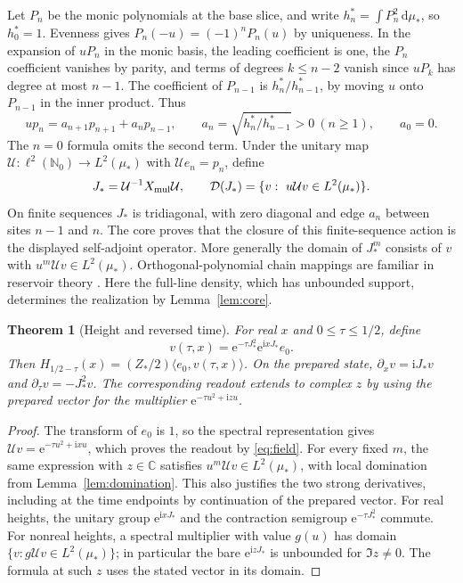 \documentclass[11pt]{article}
\numberwithin{equation}{section}
\newtheorem{theorem}{Theorem}[section]
\newcommand{\C}{\mathbb C}
\newcommand{\ee}{\mathrm e}
\newcommand{\ii}{\mathrm i}
\newcommand{\dd}{\,\mathrm d}
\newcommand{\ip}[2]{\langle #1,#2\rangle}
\begin{document}
Let \(P_n\) be the monic polynomials at the base slice, and write
\(h_n^*=\int P_n^2\dd\mu_*\), so \(h_0^*=1\).
Evenness gives \(P_n(-u)=(-1)^nP_n(u)\) by uniqueness.
In the expansion of \(uP_n\) in the monic basis, the leading
coefficient is one, the \(P_n\) coefficient vanishes by parity, and
terms of degrees \(k\le n-2\) vanish since \(uP_k\) has degree at most
\(n-1\). The coefficient of \(P_{n-1}\) is \(h_n^*/h_{n-1}^*\),
by moving \(u\) onto \(P_{n-1}\) in the inner product. Thus
\[
 up_n=a_{n+1}p_{n+1}+a_np_{n-1},\qquad
 a_n=\sqrt{h_n^*/h_{n-1}^*}>0\ (n\ge1),\qquad a_0=0.
\]
The \(n=0\) formula omits the second term. Under the unitary map
\(\mathcal U:\ell^2(\mathbb N_0)\to L^2(\mu_*)\) with
\(\mathcal U e_n=p_n\), define
\[
 J_*=\mathcal U^{-1}X_{\rm mul}\mathcal U,\qquad
 \mathcal D(J_*)=\{v:\ u\mathcal Uv\in L^2(\mu_*)\}.
\]
On finite sequences \(J_*\) is tridiagonal, with zero diagonal and
edge \(a_n\) between sites \(n-1\) and \(n\). The core proves that
the closure of this finite-sequence action is the displayed
self-adjoint operator. More generally the domain of \(J_*^m\) consists
of \(v\) with \(u^m\mathcal Uv\in L^2(\mu_*)\). Orthogonal-polynomial
chain mappings are familiar in reservoir theory \cite{chin}.
Here the full-line density, which has unbounded support, determines
the realization by Lemma~\ref{lem:core}.

\begin{theorem}[Height and reversed time]\label{thm:orbit}
For real \(x\) and \(0\le\tau\le1/2\), define
\[
 v(\tau,x)=\ee^{-\tau J_*^2}\ee^{\ii xJ_*}e_0 .
\]
Then \(H_{1/2-\tau}(x)=(Z_*/2)\ip{e_0}{v(\tau,x)}\).
On the prepared state, \(\partial_xv=\ii J_*v\) and
\(\partial_\tau v=-J_*^2v\). The corresponding readout extends to
complex \(z\) by using the prepared vector for the multiplier
\(\ee^{-\tau u^2+\ii zu}\).
\end{theorem}
\begin{proof}
The transform of \(e_0\) is \(1\), so the spectral representation
gives \(\mathcal Uv=\ee^{-\tau u^2+\ii xu}\), which proves the
readout by \eqref{eq:field}. For every fixed \(m\), the same expression
with \(z\in\C\) satisfies \(u^m\mathcal Uv\in L^2(\mu_*)\), with
local domination from Lemma~\ref{lem:domination}. This also
justifies the two strong derivatives, including at the time
endpoints by continuation of the prepared vector. For real heights,
the unitary group \(\ee^{\ii xJ_*}\) and the contraction semigroup
\(\ee^{-\tau J_*^2}\) commute. For nonreal heights, a spectral
multiplier with value \(g(u)\) has domain
\(\{v:g\mathcal Uv\in L^2(\mu_*)\}\); in particular the bare
\(\ee^{\ii zJ_*}\) is unbounded for \(\Im z\ne0\). The formula at
such \(z\) uses the stated vector in its domain.
\end{proof}
\end{document}
